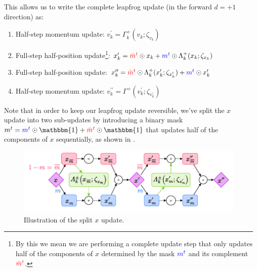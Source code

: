 \documentclass{article} %
\newcommand{\mbart}{\textcolor{red}{\bar{m}^{t}}}
\newcommand{\mt}{\textcolor{blue}{m^{t}}}
\begin{document}
This allows us to write the complete leapfrog update (in the forward \(d=+1\) direction) as:
%
\begin{enumerate}
   \item Half-step momentum update: \hspace{29pt}\(%
      v^{\prime}_{k} = \Gamma^{+}_{k}(v_{k};\zeta_{v_{k}})%
   \)
   \item Full-step half-position update\footnote{By this we mean we are performing a complete update step that only
      updates half of the components of \(x\) determined by the mask \(\mt\) and its complement \(\mbart\).}:
      \hspace{17pt} \(%
      x^{\prime}_{k} = \mbart\odot x_{k} + \mt\odot \Lambda^{+}_{k}(x_{k};\zeta_{x_{k}})
   \)
   \item Full-step half-position update: \hspace{20pt} \(%
         x^{\prime\prime}_{k} = \mbart\odot\Lambda^{+}_{k}(x^{\prime}_{k};\zeta_{x^{\prime}_{k}}) + \mt\odot x^{\prime}_{k}
   \)
      \item Half-step momentum update: \hspace{24pt} \(%
         v^{\prime\prime}_{k} = \Gamma^{+}(v^{\prime}_{k}; \zeta_{v^{\prime}_{k}})
         \)
\end{enumerate}
%
Note that in order to keep our leapfrog update reversible, we've split the \(x\) update into two sub-updates by
introducing a binary mask \(m^{t} = \mt\odot\mathbbm{1} + \mbart\odot\mathbbm{1}\) that updates half of the components
of \(x\) sequentially, as shown in .
%
\begin{figure}[htpb]
   \centering
   \includegraphics[width=\textwidth]{figures/splitx4.pdf}
   \caption{\label{fig:splitx}Illustration of the split \(x\) update.}
\end{figure}
%
\end{document}
